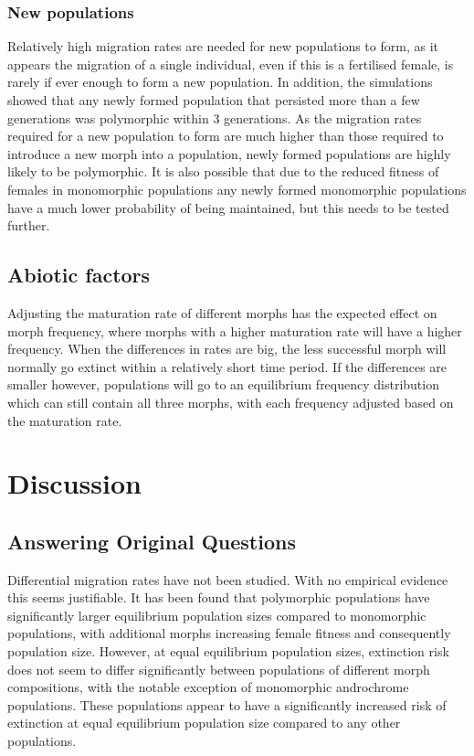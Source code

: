\documentclass{article}
\begin{document}
\subsubsection{New populations}
Relatively high migration rates are needed for new populations to form, as it appears the migration of a single individual, even if this is a fertilised female, is rarely if ever enough to form a new population. In addition, the simulations showed that any newly formed population that persisted more than a few generations was polymorphic within 3 generations. As the migration rates required for a new population to form are much higher than those required to introduce a new morph into a population, newly formed populations are highly likely to be polymorphic. It is also possible that due to the reduced fitness of females in monomorphic populations any newly formed monomorphic populations have a much lower probability of being maintained, but this needs to be tested further.

\subsection{Abiotic factors}

Adjusting the maturation rate of different morphs has the expected effect on morph frequency, where morphs with a higher maturation rate will have a higher frequency. When the differences in rates are big, the less successful morph will normally go extinct within a relatively short time period. If the differences are smaller however, populations will go to an equilibrium frequency distribution which can still contain all three morphs, with each frequency adjusted based on the maturation rate.

\section{Discussion}

\subsection{Answering Original Questions}
Differential migration rates have not been studied. With no empirical evidence this seems justifiable.
It has been found that polymorphic populations have significantly larger equilibrium population sizes compared to monomorphic populations, with additional morphs increasing female fitness and consequently population size. However, at equal equilibrium population sizes, extinction risk does not seem to differ significantly between populations of different morph compositions, with the notable exception of monomorphic androchrome populations. These populations appear to have a significantly increased risk of extinction at equal equilibrium population size compared to any other populations.
\end{document}
